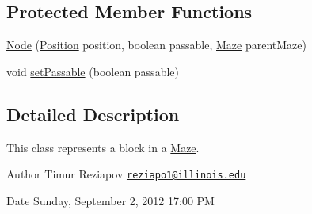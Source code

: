 \subsection*{Protected Member Functions}
\begin{DoxyCompactItemize}
\item 
\hyperlink{classmazelib_1_1data_1_1_node_abb9bb1179d4fa3877d267126a72146fd}{Node} (\hyperlink{classmazelib_1_1data_1_1_position}{Position} position, boolean passable, \hyperlink{classmazelib_1_1data_1_1_maze}{Maze} parent\-Maze)
\item 
void \hyperlink{classmazelib_1_1data_1_1_node_a0e95a8e452791ec769b56bb7d5cf2132}{set\-Passable} (boolean passable)
\end{DoxyCompactItemize}


\subsection{Detailed Description}
This class represents a block in a \hyperlink{classmazelib_1_1data_1_1_maze}{Maze}. \begin{DoxyAuthor}{Author}
Timur Reziapov \href{mailto:reziapo1@illinois.edu}{\tt reziapo1@illinois.\-edu} 
\end{DoxyAuthor}
\begin{DoxyDate}{Date}
Sunday, September 2, 2012 17\-:00 P\-M 
\end{DoxyDate}


